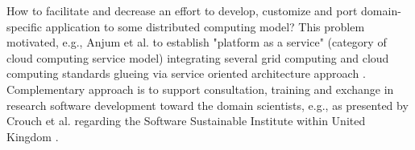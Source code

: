 How to facilitate and decrease an effort to develop, customize and port domain-specific application to some distributed computing model? This problem motivated, 
e.g., Anjum et al. to establish "platform as a service" (category of cloud computing service model) integrating several grid computing and cloud computing standards glueing via service oriented architecture approach \cite{Anjum2012}. 
Complementary approach is to support consultation, training and exchange in research software development toward the domain scientists, e.g., as presented by Crouch et al. regarding the Software Sustainable Institute within United Kingdom \cite{Crouch2013}.


